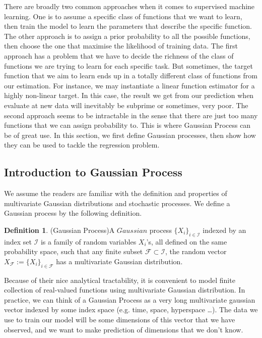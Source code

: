 \documentclass[12pt,a4paper]{article}
\theoremstyle{definition}
\newtheorem{definition}[theorem]{Definition}
\numberwithin{equation}{section}
\begin{document}
There are broadly two common approaches when it comes to supervised machine learning. One is to assume a specific class of functions that we want to learn, then train the model to learn the parameters that describe the specific function. The other approach is to assign a prior probability to all the possible functions, then choose the one that maximise the likelihood of training data. The first approach has a problem that we have to decide the richness of the class of functions we are trying to learn for each specific task. But sometimes, the target function that we aim to learn ends up in a totally different class of functions from our estimation. For instance, we may instantiate a linear function estimator for a highly non-linear target. In this case, the result we get from our prediction when evaluate at new data will inevitably be subprime or sometimes, very poor. The second approach seems to be intractable in the sense that there are just too many functions that we can assign probability to. This is where Gaussian Process can be of great use. In this section, we first define Gaussian processes, then show how they can be used to tackle the regression problem. 

\subsection{Introduction to Gaussian Process}

We assume the readers are familiar with the definition and properties of multivariate Gaussian distributions and stochastic processes. We define a Gaussian process by the following definition.

\begin{definition}(Gaussian Process)\label{def:gp}
	A $Gaussian$ process $\{X_i\}_{i\in \mathcal{I}}$ indexed by an index set $\mathcal{I}$ is a family of random variables $X_i$'s, all defined on the same probability space, such that any finite subset $\mathcal{F}\subset\mathcal{I}$, the random vector $X_{\mathcal{F}} := \{X_i\}_{i\in \mathcal{F}}$ has a multivariate Gaussian distribution.\cite[Lalley]{Lalley}
\end{definition}

Because of their nice analytical tractability, it is convenient to model finite collection of real-valued functions using  multivariate Gaussian distribution. In practice, we can think of a Gaussian Process as a very long multivariate gaussian vector indexed by some index space (e.g. time, space, hyperspace \ldots). The data we use to train our model will be some dimensions of this vector that we have observed, and we want to make prediction of dimensions that we don't know. 
\end{document}
